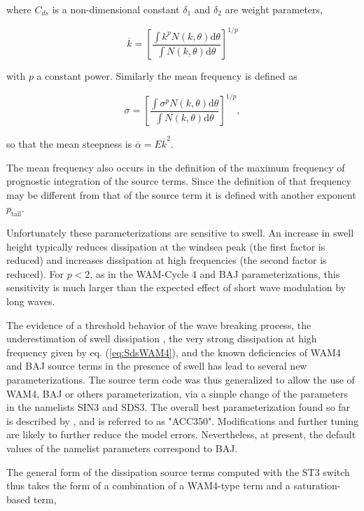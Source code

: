 \noindent
where $C_{ds}$ is a non-dimensional constant $\delta_1$ and $\delta_2$ are
weight parameters,

\begin{equation}
\overline{k}=\left[\frac{\int k^p N\left(k,\theta\right) {\mathrm d}
\theta}{\int N\left(k,\theta\right) {\mathrm d} \theta}\right]^{1/p}
\end{equation}

\noindent
with $p$ a constant power. Similarly the mean frequency is defined as

\begin{equation}
\overline{\sigma}=\left[\frac{\int \sigma^p N\left(k,\theta\right) {\mathrm d}
\theta}{ \int N\left(k,\theta\right) {\mathrm d} \theta}\right]^{1/p},
\end{equation}

\noindent
so that the mean steepness is $\overline{\alpha}=E \overline{k}^2$.

The mean frequency also occurs in the definition of the maximum frequency of
prognostic integration of the source terms. Since the definition of that
frequency may be different from that of the source term it is defined with
another exponent $p_{\mathrm{tail}}$.

Unfortunately these parameterizations are sensitive to swell. An increase in
swell height typically reduces dissipation at the windsea peak (the first
factor is reduced) and increases dissipation at high frequencies (the second
factor is reduced). For $p< 2$, as in the WAM-Cycle 4 and BAJ
parameterizations, this sensitivity is much larger than the expected effect of
short wave modulation by long waves.

The evidence of a threshold behavior of the wave breaking process, the
underestimation of swell dissipation \citep{tol:OMB02a}, the very strong
dissipation at high frequency given by eq. (\ref{eq:SdsWAM4}), and the known
deficiencies of WAM4 and BAJ source terms in the presence of swell has lead to
several new parameterizations. The source term code was thus generalized to
allow the use of WAM4, BAJ or others parameterization, via a simple change of
the parameters in the namelists SIN3 and SDS3. The overall best
parameterization found so far is described by \cite{art:ACC08}, and is referred
to as "ACC350". Modifications and further tuning are likely to further reduce
the model errors. Nevertheless, at present, the default values of the namelist
parameters correspond to BAJ.

The general form of the dissipation source terms computed with the ST3 switch
thus takes the form of a combination of a WAM4-type term and a saturation-based
term,

